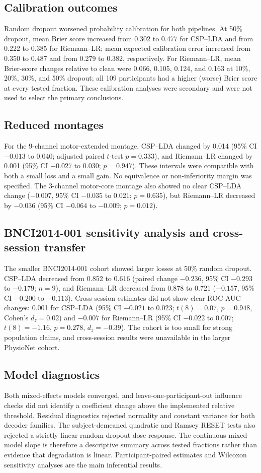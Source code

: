 \documentclass[11pt]{article}
\begin{document}
\subsection{Calibration outcomes}
Random dropout worsened probability calibration for both pipelines. At 50\% dropout, mean Brier score increased from 0.302 to 0.477 for CSP--LDA and from 0.222 to 0.385 for Riemann--LR; mean expected calibration error increased from 0.350 to 0.487 and from 0.279 to 0.382, respectively. For Riemann--LR, mean Brier-score changes relative to clean were 0.066, 0.105, 0.124, and 0.163 at 10\%, 20\%, 30\%, and 50\% dropout; all 109 participants had a higher (worse) Brier score at every tested fraction. These calibration analyses were secondary and were not used to select the primary conclusions.

\subsection{Reduced montages}
For the 9-channel motor-extended montage, CSP--LDA changed by 0.014 (95\% CI $-0.013$ to 0.040; adjusted paired $t$-test $p=0.333$), and Riemann--LR changed by 0.001 (95\% CI $-0.027$ to 0.030; $p=0.947$). These intervals were compatible with both a small loss and a small gain. No equivalence or non-inferiority margin was specified. The 3-channel motor-core montage also showed no clear CSP--LDA change ($-0.007$, 95\% CI $-0.035$ to 0.021; $p=0.635$), but Riemann--LR decreased by $-0.036$ (95\% CI $-0.064$ to $-0.009$; $p=0.012$).

\subsection{BNCI2014-001 sensitivity analysis and cross-session transfer}
The smaller BNCI2014-001 cohort showed larger losses at 50\% random dropout. CSP--LDA decreased from 0.852 to 0.616 (paired change $-0.236$, 95\% CI $-0.293$ to $-0.179$; $n=9$), and Riemann--LR decreased from 0.878 to 0.721 ($-0.157$, 95\% CI $-0.200$ to $-0.113$). Cross-session estimates did not show clear ROC-AUC changes: 0.001 for CSP--LDA (95\% CI $-0.021$ to 0.023; $t(8)=0.07$, $p=0.948$, Cohen's $d_z=0.02$) and $-0.007$ for Riemann--LR (95\% CI $-0.022$ to 0.007; $t(8)=-1.16$, $p=0.278$, $d_z=-0.39$). The cohort is too small for strong population claims, and cross-session results were unavailable in the larger PhysioNet cohort.

\subsection{Model diagnostics}
Both mixed-effects models converged, and leave-one-participant-out influence checks did not identify a coefficient change above the implemented relative threshold. Residual diagnostics rejected normality and constant variance for both decoder families. The subject-demeaned quadratic and Ramsey RESET tests also rejected a strictly linear random-dropout dose response. The continuous mixed-model slope is therefore a descriptive summary across tested fractions rather than evidence that degradation is linear. Participant-paired estimates and Wilcoxon sensitivity analyses are the main inferential results.
\end{document}
